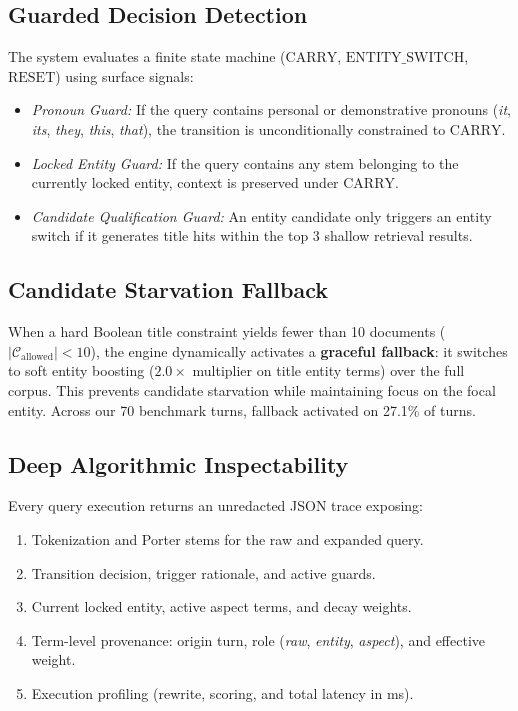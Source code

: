 \documentclass[10pt,a4paper,twocolumn]{article}
\begin{document}
\subsection{Guarded Decision Detection}
The system evaluates a finite state machine ($\text{CARRY}$, $\text{ENTITY\_SWITCH}$, $\text{RESET}$) using surface signals:
\begin{itemize}
    \item \textit{Pronoun Guard:} If the query contains personal or demonstrative pronouns (\textit{it}, \textit{its}, \textit{they}, \textit{this}, \textit{that}), the transition is unconditionally constrained to $\text{CARRY}$.
    \item \textit{Locked Entity Guard:} If the query contains any stem belonging to the currently locked entity, context is preserved under $\text{CARRY}$.
    \item \textit{Candidate Qualification Guard:} An entity candidate only triggers an entity switch if it generates title hits within the top 3 shallow retrieval results.
\end{itemize}

\subsection{Candidate Starvation Fallback}
When a hard Boolean title constraint yields fewer than 10 documents ($|\mathcal{C}_{\text{allowed}}| < 10$), the engine dynamically activates a \textbf{graceful fallback}: it switches to soft entity boosting ($2.0\times$ multiplier on title entity terms) over the full corpus. This prevents candidate starvation while maintaining focus on the focal entity. Across our 70 benchmark turns, fallback activated on 27.1\% of turns.

\subsection{Deep Algorithmic Inspectability}
Every query execution returns an unredacted JSON trace exposing:
\begin{enumerate}
    \item Tokenization and Porter stems for the raw and expanded query.
    \item Transition decision, trigger rationale, and active guards.
    \item Current locked entity, active aspect terms, and decay weights.
    \item Term-level provenance: origin turn, role (\textit{raw}, \textit{entity}, \textit{aspect}), and effective weight.
    \item Execution profiling (rewrite, scoring, and total latency in ms).
\end{enumerate}
\end{document}
